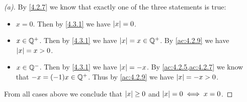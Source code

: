 \begin{proof}[(a)]
  By \cref{4.2.7} we know that exactly one of the three statements is true:
  \begin{itemize}
    \item \(x = 0\).
          Then by \cref{4.3.1} we have \(\left\lvert x\right\rvert = 0\).
    \item \(x \in \mathbb{Q}^+\).
          Then by \cref{4.3.1} we have \(\left\lvert x\right\rvert = x \in \mathbb{Q}^+\).
          By \cref{ac:4.2.9} we have \(\left\lvert x\right\rvert = x > 0\).
    \item \(x \in \mathbb{Q}^-\).
          Then by \cref{4.3.1} we have \(\left\lvert x\right\rvert = -x\).
          By \cref{ac:4.2.5,ac:4.2.7} we know that \(-x = (-1)x \in \mathbb{Q}^+\).
          Thus by \cref{ac:4.2.9} we have \(\left\lvert x\right\rvert = -x > 0\).
  \end{itemize}
  From all cases above we conclude that \(\left\lvert x\right\rvert \geq 0\) and \(\left\lvert x\right\rvert = 0 \iff x = 0\).
\end{proof}

